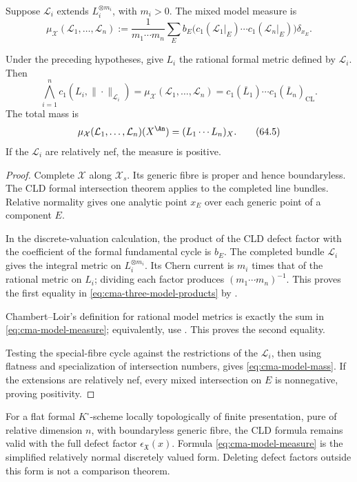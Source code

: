 Suppose $\mathcal L_i$ extends $L_i^{\otimes m_i}$, with
$m_i>0$.
The mixed model measure is
\[
 \mu_{\mathcal X}(\mathcal L_1,\ldots,\mathcal L_n)
 :=\frac{1}{m_1\cdots m_n}
   \sum_E b_E
   \bigl(c_1(\mathcal L_1|_E)\cdots
         c_1(\mathcal L_n|_E)\bigr)\delta_{x_E}.
\tag{64.3}\label{eq:cma-model-measure}
\]

\begin{theorem}\label{thm:cma-model-cld}
Under the preceding hypotheses, give $L_i$ the rational formal metric
defined by $\mathcal L_i$.
Then
\[
 \bigwedge_{i=1}^n c_1(L_i,\|\cdot\|_{\mathcal L_i})
 =\mu_{\mathcal X}(\mathcal L_1,\ldots,\mathcal L_n)
 =c_1(\overline L_1)\cdots c_1(\overline L_n)_{\mathrm{CL}}.
\tag{64.4}\label{eq:cma-three-model-products}
\]
The total mass is
\[
       \mu_{\mathcal X}(\mathcal L_1,\ldots,\mathcal L_n)
               (X^{\An})=(L_1\cdots L_n)_X.
\tag{64.5}\label{eq:cma-model-mass}
\]
If the $\mathcal L_i$ are relatively nef, the measure is positive.
\end{theorem}

\begin{proof}
Complete $\mathcal X$ along $\mathcal X_s$.
Its generic fibre is proper and hence boundaryless.
The CLD formal intersection theorem applies to the completed line bundles.
Relative normality gives one analytic point $x_E$ over each generic point
of a component $E$.

In the discrete-valuation calculation, the product of the CLD defect factor
with the coefficient of the formal fundamental cycle is $b_E$.
The completed bundle $\mathcal L_i$ gives the integral metric on
$L_i^{\otimes m_i}$. Its Chern current is $m_i$ times that of the
rational metric on $L_i$; dividing each factor produces
$(m_1\cdots m_n)^{-1}$.
This proves the first equality in
\eqref{eq:cma-three-model-products} by
\cite[Theorem~18.5.5]{CLD25}.

Chambert--Loir's definition for rational model metrics is exactly the sum
in \eqref{eq:cma-model-measure}; equivalently, use
\cite[Proposition~18.5.8]{CLD25}.
This proves the second equality.

Testing the special-fibre cycle against the restrictions of the
$\mathcal L_i$, then using flatness and specialization of intersection
numbers, gives \eqref{eq:cma-model-mass}.
If the extensions are relatively nef, every mixed intersection on $E$ is
nonnegative, proving positivity.
\end{proof}

\begin{remark}
\label{rem:cma-formal-defects}
For a flat formal $K^\circ$-scheme locally topologically of finite
presentation, pure of relative dimension $n$, with boundaryless generic
fibre, the CLD formula remains valid with the full defect factor
$\epsilon_{\mathfrak X}(x)$.
Formula \eqref{eq:cma-model-measure} is the simplified relatively normal
discretely valued form.
Deleting defect factors outside this form is not a comparison theorem.
\end{remark}

